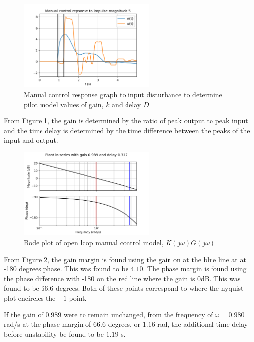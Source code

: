 \documentclass[8pt]{article}
\begin{document}
\newpage

\begin{figure}[H]
    \centering
    \includegraphics[width=0.6\textwidth]{figures/FIGURE_1.png}
    \caption{Manual control response graph to input disturbance to determine pilot model values of gain, $k$ and delay $D$}
    \label{fig:figure1}
\end{figure}

From Figure \ref{fig:figure1}, the gain is determined by the ratio of peak output to peak input and the time delay is determined by the time difference between the peaks of the input and output.

\begin{figure}[H]
    \centering
    \includegraphics[width=0.6\textwidth]{figures/FIGURE_2.png}
    \caption{Bode plot of open loop manual control model, $K(j\omega)G(j\omega)$}
    \label{fig:figure2}
\end{figure}

From Figure \ref{fig:figure2}, the gain margin is found using the gain on at the blue line at at -180 degrees phase. This was found to be $4.10$.
The phase margin is found using the phase difference with -180 on the red line where the gain is 0dB. This was found to be $66.6$ degrees. Both of these points correspond to where the nyquist plot encircles the $-1$ point.

If the gain of 0.989 were to remain unchanged, from the frequency of $\omega = 0.980$ rad/s at the phase margin of $66.6$ degrees, or $1.16$ rad, the additional time delay before unstability be found to be $1.19$ s.
\end{document}
